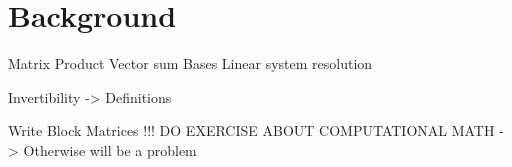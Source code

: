 \chapter{Background}

Matrix Product 
Vector sum
Bases
Linear system resolution

Invertibility -> Definitions

Write Block Matrices !!!
DO EXERCISE ABOUT COMPUTATIONAL MATH -> Otherwise will be a problem
